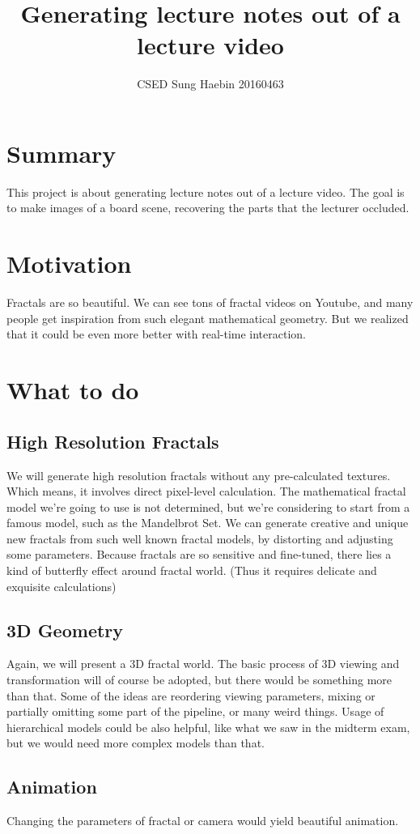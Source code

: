\documentclass[a4paper]{article}
\title{Generating lecture notes out of a lecture video}
\author{CSED Sung Haebin 20160463}
\begin{document}
\maketitle
\section{Summary}
This project is about generating lecture notes out of a lecture video.
The goal is to make images of a board scene, recovering the parts that the lecturer occluded.
\section{Motivation}
Fractals are so beautiful.
We can see tons of fractal videos on Youtube, and many people get inspiration from such elegant mathematical geometry.
But we realized that it could be even more better with real-time interaction.
\section{What to do}
\subsection{High Resolution Fractals}
We will generate high resolution fractals without any pre-calculated textures.
Which means, it involves direct pixel-level calculation.
The mathematical fractal model we're going to use is not determined, but we're considering to start from a famous model, such as the Mandelbrot Set.
We can generate creative and unique new fractals from such well known fractal models, by distorting and adjusting some parameters.
Because fractals are so sensitive and fine-tuned, there lies a kind of butterfly effect around fractal world.
(Thus it requires delicate and exquisite calculations)
\subsection{3D Geometry}
Again, we will present a 3D fractal world.
The basic process of 3D viewing and transformation will of course be adopted, but there would be something more than that.
Some of the ideas are reordering viewing parameters, mixing or partially omitting some part of the pipeline, or many weird things.
Usage of hierarchical models could be also helpful, like what we saw in the midterm exam, but we would need more complex models than that.
\subsection{Animation}
Changing the parameters of fractal or camera would yield beautiful animation.
\end{document}
